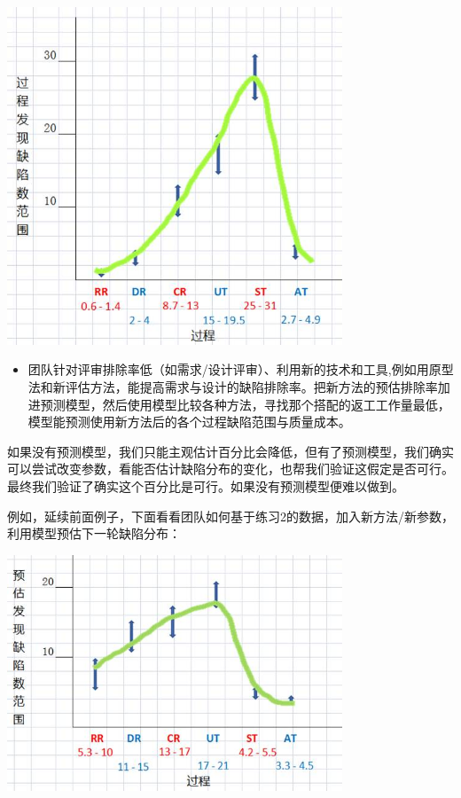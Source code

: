 
\includegraphics[width=10cm]{2AxtalBallPredictScreenshot_2021-12-01_2124551.jpg}

\begin{itemize}
\tightlist
\item
  团队针对评审排除率低（如需求/设计评审）、利用新的技术和工具,例如用原型法和新评估方法，能提高需求与设计的缺陷排除率。把新方法的预估排除率加进预测模型，然后使用模型比较各种方法，寻找那个搭配的返工工作量最低，模型能预测使用新方法后的各个过程缺陷范围与质量成本。
\end{itemize}

如果没有预测模型，我们只能主观估计百分比会降低，但有了预测模型，我们确实可以尝试改变参数，看能否估计缺陷分布的变化，也帮我们验证这假定是否可行。最终我们验证了确实这个百分比是可行。如果没有预测模型便难以做到。

例如，延续前面例子，下面看看团队如何基于练习2的数据，加入新方法/新参数，利用模型预估下一轮缺陷分布：


\includegraphics[width=10cm]{微信截图_202112071327121.jpg}

